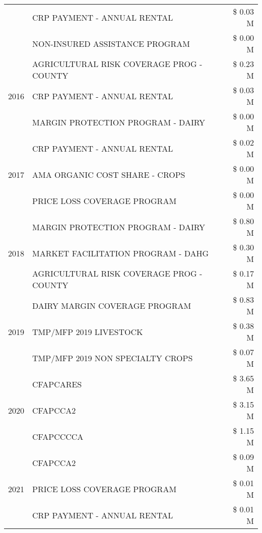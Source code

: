 \begin{tabular}{llr}
 & CRP PAYMENT - ANNUAL RENTAL & \$ 0.03 M \\
 & NON-INSURED ASSISTANCE PROGRAM & \$ 0.00 M \\
\cline{1-3}
\multirow[t]{3}{*}{2016} & AGRICULTURAL RISK COVERAGE PROG - COUNTY & \$ 0.23 M \\
 & CRP PAYMENT - ANNUAL RENTAL & \$ 0.03 M \\
 & MARGIN PROTECTION PROGRAM - DAIRY & \$ 0.00 M \\
\cline{1-3}
\multirow[t]{3}{*}{2017} & CRP PAYMENT - ANNUAL RENTAL & \$ 0.02 M \\
 & AMA ORGANIC COST SHARE - CROPS & \$ 0.00 M \\
 & PRICE LOSS COVERAGE PROGRAM & \$ 0.00 M \\
\cline{1-3}
\multirow[t]{3}{*}{2018} & MARGIN PROTECTION PROGRAM - DAIRY & \$ 0.80 M \\
 & MARKET FACILITATION PROGRAM - DAHG & \$ 0.30 M \\
 & AGRICULTURAL RISK COVERAGE PROG - COUNTY & \$ 0.17 M \\
\cline{1-3}
\multirow[t]{3}{*}{2019} & DAIRY MARGIN COVERAGE PROGRAM & \$ 0.83 M \\
 & TMP/MFP 2019 LIVESTOCK & \$ 0.38 M \\
 & TMP/MFP 2019 NON SPECIALTY CROPS & \$ 0.07 M \\
\cline{1-3}
\multirow[t]{3}{*}{2020} & CFAPCARES & \$ 3.65 M \\
 & CFAPCCA2 & \$ 3.15 M \\
 & CFAPCCCCA & \$ 1.15 M \\
\cline{1-3}
\multirow[t]{3}{*}{2021} & CFAPCCA2 & \$ 0.09 M \\
 & PRICE LOSS COVERAGE PROGRAM & \$ 0.01 M \\
 & CRP PAYMENT - ANNUAL RENTAL & \$ 0.01 M \\
\cline{1-3}
\bottomrule
\end{tabular}
